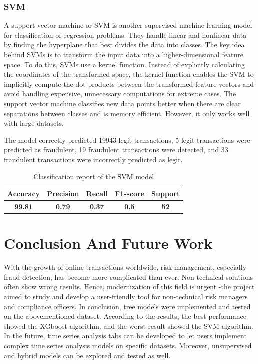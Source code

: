 \documentclass[a4paper,twocolumn,12pt]{article}
\begin{document}
\subsubsection{SVM}

A support vector machine or SVM is another supervised machine learning model for classification or regression problems. They handle linear and nonlinear data by finding the hyperplane that best divides the data into classes. The key idea behind SVMs is to transform the input data into a higher-dimensional feature space. To do this, SVMs use a kernel function. Instead of explicitly calculating the coordinates of the transformed space, the kernel function enables the SVM to implicitly compute the dot products between the transformed feature vectors and avoid handling expensive, unnecessary computations for extreme cases.\cite{SVM} The support vector machine classifies new data points better when there are clear separations between classes and is memory efficient. However, it only works well with large datasets. 

The model correctly predicted 19943 legit transactions, 5 legit transactions were predicted as fraudulent, 19 fraudulent transactions were detected, and 33 fraudulent transactions were incorrectly predicted as legit. 


\begin{table}[h!]
\centering
\begin{tabular}{||c c c c c||} 
 \hline
 Accuracy & Precision & Recall & F1-score & Support \\ [0.5ex]
 \hline\hline
 \textbf{99.81} & \textbf{0.79} & \textbf{0.37} & \textbf{0.5} &\textbf{52} \\ 
 \hline
\end{tabular}
\caption{Classification report of the SVM model}
\label{table:3}
\end{table}



\section{Conclusion And Future Work}

With the growth of online transactions worldwide, risk management, especially fraud detection, has become more complicated than ever. Non-technical solutions often show wrong results. Hence, modernization of this field is urgent -the project aimed to study and develop a user-friendly tool for non-technical risk managers and compliance officers. 
In conclusion, tree models were implemented and tested on the abovementioned dataset. According to the results, the best performance showed the XGboost algorithm, and the worst result showed the SVM algorithm. In the future, time series analysis tabs can be developed to let users implement complex time series analysis models on specific datasets. Moreover, unsupervised and hybrid models can be explored and tested as well.


\clearpage


\end{document}
